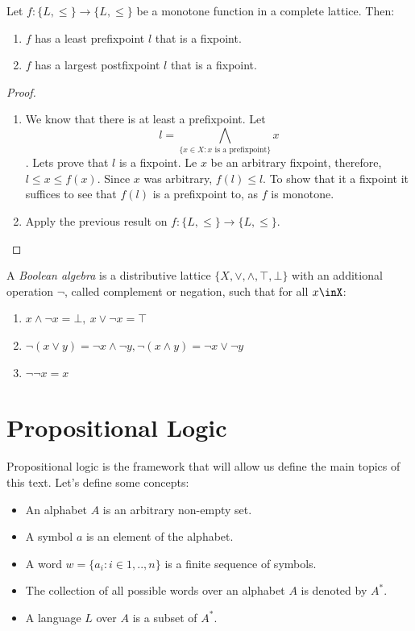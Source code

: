 \begin{theorem}
  Let $f:\{L,\le\}\to \{L,\le\}$ be a monotone function in a complete lattice. Then:
  \begin{enumerate}
  \item $f$ has a least prefixpoint $l$ that is a fixpoint.
  \item $f$ has a largest postfixpoint $l$ that is a fixpoint.
  \end{enumerate}
\end{theorem}
\begin{proof}\\
  
  \begin{enumerate}
  \item We know that there is at least a prefixpoint. Let
    $$l = \bigwedge_{\{x\in X: x\text{ is a prefixpoint}\}} x $$. 
    Lets prove that $l$ is a fixpoint. Le $x$ be an arbitrary fixpoint, therefore, $l \le x \le f(x)$. Since $x$ was arbitrary, $f(l) \le l$. To show that it a fixpoint it suffices to see that $f(l)$ is a prefixpoint to, as $f$ is monotone.
  \item Apply the previous result on $f:\{L,\le\}\to \{L,\le\}$.
  \end{enumerate}
\end{proof}


\begin{definition}
  A \emph{Boolean algebra} is a distributive lattice  $\{X, \vee, \wedge, \top,\bot\}$ with an additional operation $\neg$, called complement or negation, such that for all $x\inX$:
  \begin{enumerate}
  \item $ x\wedge \neg x = \bot,\ x\vee \neg x = \top $
  \item $ \neg(x \vee y) = \neg x \wedge \neg y,  \neg(x \wedge y) = \neg x \vee \neg y$
  \item $\neg \neg x = x$
  \end{enumerate}
\end{definition}



\section{Propositional Logic}
Propositional logic is the framework that will allow us define the main topics of this text.  Let's define some concepts:
\begin{itemize}
\item An alphabet $A$ is an arbitrary non-empty set.
\item A symbol $a$ is an element of the alphabet.
\item A word $w = \{a_i:i\in 1,..,n\}$ is a finite sequence of symbols.
\item The collection of all possible words over an alphabet $A$ is denoted by $A^*$.
\item A language $L$ over $A$ is a subset of $A^*$.
\end{itemize}

